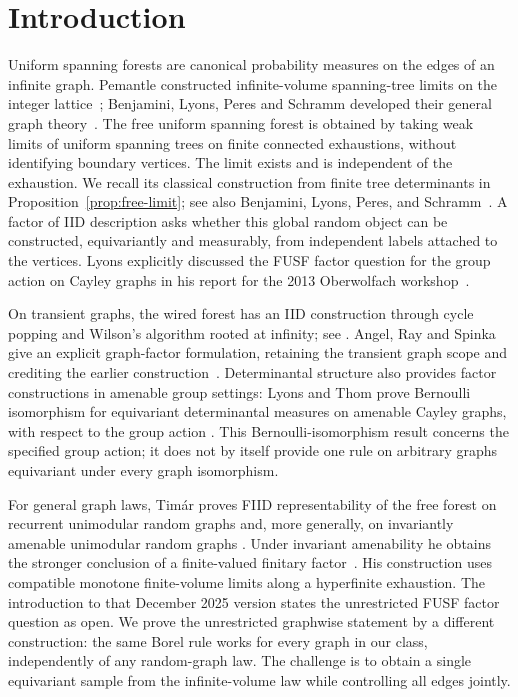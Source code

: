 \section{Introduction}
\label{sec:introduction}

Uniform spanning forests are canonical probability measures on the edges of
an infinite graph. Pemantle constructed infinite-volume spanning-tree limits
on the integer lattice~\cite[Theorem~2.3]{Pemantle1991}; Benjamini, Lyons,
Peres and Schramm developed their general graph theory~\cite{BLPS2001}. The free uniform spanning forest is obtained by taking
weak limits of uniform spanning trees on finite connected exhaustions, without
identifying boundary vertices. The limit exists and is independent of the
exhaustion. We recall its classical construction from finite tree determinants
in Proposition~\ref{prop:free-limit}; see also Benjamini, Lyons, Peres, and
Schramm~\cite[Section~5]{BLPS2001}.
A factor of IID description asks whether this global random object can be
constructed, equivariantly and measurably, from independent labels attached
to the vertices. Lyons explicitly discussed the FUSF factor question for
the group action on Cayley graphs in his report for the 2013 Oberwolfach
workshop~\cite[p.~2392]{Lyons2013}.

On transient graphs, the wired forest has an IID construction through
cycle popping and Wilson's algorithm rooted at infinity; see
\cite[Theorem~5.1]{BLPS2001}. Angel, Ray and Spinka give an explicit
graph-factor formulation, retaining the transient graph scope and crediting
the earlier construction~\cite[Section~4]{AngelRaySpinka2024}. Determinantal structure also provides
factor constructions in amenable group settings: Lyons and Thom prove
Bernoulli isomorphism for equivariant determinantal measures on amenable
Cayley graphs, with respect to the group action \cite[Corollary~7.4]{LyonsThom2016}. This Bernoulli-isomorphism result concerns
the specified group action; it does not by itself provide one rule
on arbitrary graphs equivariant under every graph isomorphism.

For general graph laws, Tim\'ar proves FIID representability of the free
forest on recurrent unimodular random graphs and, more generally, on
invariantly amenable unimodular random graphs
\cite[arXiv version, Theorem~1 and Corollary~5]{Timar2025}.
Under invariant amenability he obtains the stronger conclusion of a
finite-valued finitary factor~\cite[arXiv version, Theorem~2(1)]{Timar2025}.
His construction uses compatible monotone finite-volume limits along a
hyperfinite exhaustion. The introduction to that December 2025 version
states the unrestricted FUSF factor question as open. We prove the
unrestricted graphwise statement by a different construction: the same
Borel rule works for every graph in our class, independently of any
random-graph law. The challenge is to obtain a single equivariant sample
from the infinite-volume law while controlling all edges jointly.

